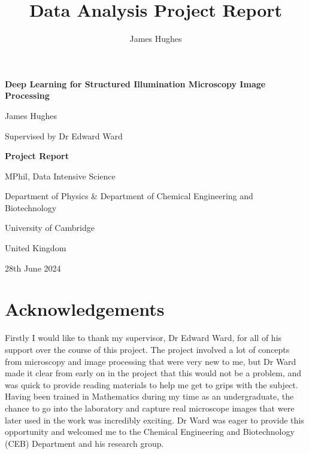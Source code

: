 \documentclass[12pt]{article}
\title{Data Analysis Project Report}
\author{James Hughes}
\begin{document}
\begin{titlepage}
    \begin{center}
        \vspace*{1cm}

        \Huge
        \textbf{Deep Learning for Structured Illumination Microscopy Image Processing}

        \vspace{0.5cm}
        \LARGE

        James Hughes

        Supervised by Dr Edward Ward

        \vspace{2cm}
        \Huge
        \textbf{Project Report}

        \vfill

        MPhil, Data Intensive Science

        \vspace{0.8cm}

        \Large
        Department of Physics \& Department of Chemical Engineering and Biotechnology

        University of Cambridge

        United Kingdom

        28th June 2024

    \end{center}
\end{titlepage}


\newpage
\section*{Acknowledgements}

Firstly I would like to thank my supervisor, Dr Edward Ward, for all of his support over the course of this project.
The project involved a lot of concepts from microscopy and image processing that were very new to me,
but Dr Ward made it clear from early on in the project that this would not be a problem,
and was quick to provide reading materials to help me get to grips with the subject.
Having been trained in Mathematics during my time as an undergraduate,
the chance to go into the laboratory and capture real microscope images that were later used in the work was incredibly exciting.
Dr Ward was eager to provide this opportunity and welcomed me to the Chemical Engineering and Biotechnology (CEB) Department and his research group.
\end{document}
